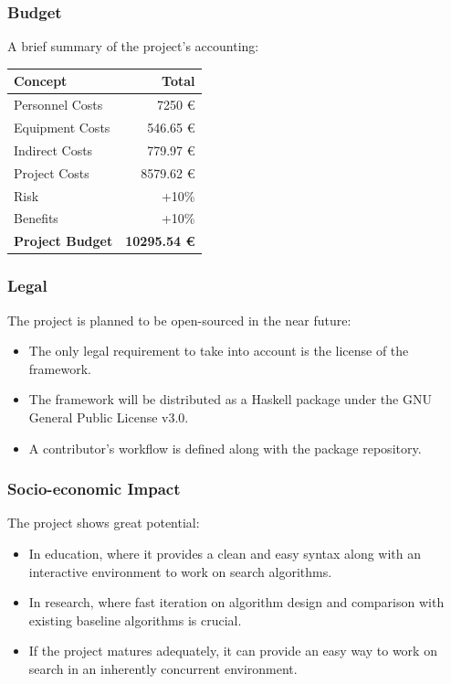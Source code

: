 \documentclass{beamer}
\begin{document}
\begin{frame}[fragile]
  \frametitle{Budget}

  A brief summary of the project's accounting:

  \begin{table}[!htbp]
    \centering
   \begin{tabular}{| l | r |}
     \hline
     Concept & Total \\
     \hline
     Personnel Costs & 7250 \euro \\
     Equipment Costs & 546.65 \euro \\
     Indirect Costs  & 779.97 \euro \\
     \hline
     Project Costs   & 8579.62 \euro \\
     Risk            & +10\% \\
     Benefits        & +10\% \\
     \hline
     \hline
     \textbf{Project Budget}  & \textbf{10295.54 \euro} \\
     \hline
   \end{tabular}
 \end{table}

\end{frame}

\begin{frame}
  \frametitle{Legal}
  The project is planned to be open-sourced in the near future:
  \begin{itemize}
  \item The only legal requirement to take into account is the license of the
    framework.
  \item The framework will be distributed as a Haskell package under the GNU
    General Public License v3.0.
  \item A contributor's workflow is defined along with the package repository.
  \end{itemize}
\end{frame}

\begin{frame}
  \frametitle{Socio-economic Impact}
  The project shows great potential:
  \begin{itemize}
  \item In education, where it provides a clean and easy syntax along with an
    interactive environment to work on search algorithms.
  \item In research, where fast iteration on algorithm design and comparison
    with existing baseline algorithms is crucial.
  \item If the project matures adequately, it can provide an easy way to work
    on search in an inherently concurrent environment.
  \end{itemize}
\end{frame}
\end{document}
